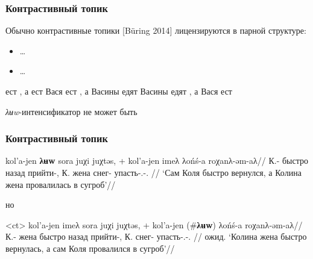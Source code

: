 \documentclass{beamer}
\begin{document}
\begin{frame}    


    \frametitle{Контрастивный топик}

    Обычно контрастивные топики [Büring 2014] лицензируются в парной структуре:
    \begin{itemize}
        \item {} … 
        \item {} … 
    \end{itemize}

    \pex
        \a {} ест , а  ест 
        \a Вася  ест , а Васины  едят 
        \a Васины  едят , а  Вася ест 
    \xe
    
    \textit{λʉw}-интенсификатор не может быть 

\end{frame}

\begin{frame}
    \frametitle{Контрастивный топик}
    
    \begingl
        \gla kol’a-jen \textbf{λʉw} sora juχi juχtəs, + kol’a-jen imeλ λońś-a roχanλ-əm-aλ//
        \glb К.-\Pssg{}  \Int{} быстро назад прийти-\Pst, К. жена снег-\Dat{} упасть-\Nfin.\Npst-\Poss{}.\Tsg{} //
        \glft ‘Сам Коля быстро вернулся, а Колина жена провалилась в сугроб’//
    \endgl
    \xe
    
    \pause
    но
    
    \ex<ct>
        \begingl
            \gla kol’a-jen imeλ sora juχi juχtəs, + kol’a-jen (\#\textbf{λʉw}) λońś-a roχanλ-əm-aλ//
            \glb К.-\Pssg{}  жена быстро назад прийти-\Pst, К. \Int{} снег-\Dat{} упасть-\Nfin.\Npst-\Poss{}.\Tsg{} //
            \glft ожид. ‘Колина жена быстро вернулась, а сам Коля провалился в сугроб’//
        \endgl
    \xe


\end{frame}
\end{document}
